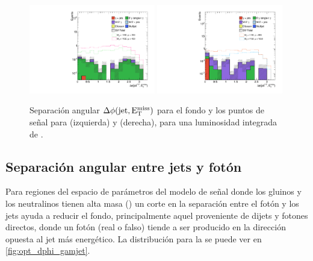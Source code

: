 \begin{figure}[!h]
  \centering

  \includegraphics[width=0.49\textwidth]{figures/dphi_jetmet_srl}
  \includegraphics[width=0.49\textwidth]{figures/dphi_jetmet_srh}

  \caption{Separación angular $\Delta \phi \mathrm{(jet, E_{\mathrm{T}}^{\mathrm{miss}})}$ para el fondo y los puntos de se\~nal para {\SRL} (izquierda) y {\SRH} (derecha),
    para una luminosidad integrada de {\ilumi}.}
  \label{fig:opt_dphi_jetmet}
\end{figure}


\subsection{Separación angular entre jets y fotón}

Para regiones del espacio de parámetros del modelo de señal
donde los gluinos y los neutralinos tienen alta masa ({\SRH})
un corte en la separación entre el fotón y los jets ayuda a
reducir el fondo, principalmente aquel proveniente de dijets y
fotones directos, donde un fotón (real o falso) tiende a ser
producido en la dirección opuesta al jet más energético.
La distribución para la {\SRH} se puede ver en \cref{fig:opt_dphi_gamjet}.


